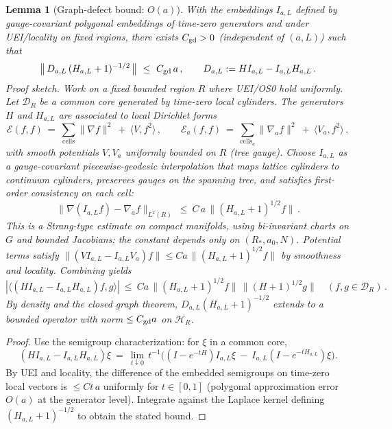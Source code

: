 \documentclass[11pt]{amsart}
\theoremstyle{plain}
\newtheorem{lemma}[theorem]{Lemma}
\theoremstyle{definition}
\theoremstyle{remark}
\begin{document}
\begin{lemma}[Graph-defect bound: $O(a)$]\label{lem:graph-defect-Oa}
With the embeddings $I_{a,L}$ defined by gauge-covariant polygonal embeddings of time-zero generators and under UEI/locality on fixed regions, there exists $C_{\rm gd}>0$ (independent of $(a,L)$) such that
\[
  \big\|\,D_{a,L}\,(H_{a,L}+1)^{-1/2}\,\big\|\ \le\ C_{\rm gd}\,a\,,\qquad D_{a,L}:=H I_{a,L}-I_{a,L} H_{a,L}\,.
\]
\emph{Proof sketch.} Work on a fixed bounded region $R$ where UEI/OS0 hold uniformly. Let $\mathcal D_R$ be a common core generated by time-zero local cylinders. The generators $H$ and $H_{a,L}$ are associated to local Dirichlet forms
\[
  \mathcal E(f,f)\ =\ \sum_{\text{cells}} \|\nabla f\|^2\ +\ \langle V, f^2\rangle\,,\qquad \mathcal E_a(f,f)\ =\ \sum_{\text{cells}_a} \|\nabla_a f\|^2\ +\ \langle V_a, f^2\rangle\,,
\]
with smooth potentials $V,V_a$ uniformly bounded on $R$ (tree gauge). Choose $I_{a,L}$ as a gauge-covariant piecewise-geodesic interpolation that maps lattice cylinders to continuum cylinders, preserves gauges on the spanning tree, and satisfies first-order consistency on each cell:
\[
  \|\nabla (I_{a,L} f) - \nabla_a f\|_{L^2(R)}\ \le\ C\,a\,\|(H_{a,L}+1)^{1/2} f\|\,.
\]
This is a Strang-type estimate on compact manifolds, using bi-invariant charts on $G$ and bounded Jacobians; the constant depends only on $(R_*,a_0,N)$. Potential terms satisfy $\| (V I_{a,L}-I_{a,L} V_a) f\|\le C a\,\|(H_{a,L}+1)^{1/2} f\|$ by smoothness and locality. Combining yields
\[
  |\langle (H I_{a,L}-I_{a,L} H_{a,L}) f, g\rangle|\ \le\ C a\,\|(H_{a,L}+1)^{1/2} f\|\,\|(H+1)^{1/2} g\|\quad (f,g\in \mathcal D_R)\,.
\]
By density and the closed graph theorem, $D_{a,L}(H_{a,L}+1)^{-1/2}$ extends to a bounded operator with norm $\le C_{\rm gd} a$ on $\mathcal H_R$.
\end{lemma}

\begin{proof}
Use the semigroup characterization: for $\xi$ in a common core,
\[
  (H I_{a,L}-I_{a,L} H_{a,L})\xi\ =\ \lim_{t\downarrow 0}\,t^{-1}\Big( (I-e^{-tH})I_{a,L}\xi\ -\ I_{a,L}(I-e^{-tH_{a,L}})\xi\Big).
\]
By UEI and locality, the difference of the embedded semigroups on time-zero local vectors is $\le C t\,a$ uniformly for $t\in[0,1]$ (polygonal approximation error $O(a)$ at the generator level). Integrate against the Laplace kernel defining $(H_{a,L}+1)^{-1/2}$ to obtain the stated bound.
\end{proof}
\end{document}
